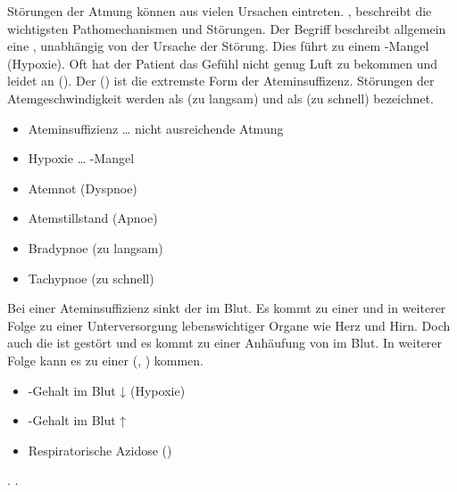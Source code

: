 {%
%
%
%
%
%
%
Störungen der Atmung können aus vielen Ursachen eintreten.
, beschreibt die
wichtigsten Pathomechanismen und Störungen.
Der Begriff  beschreibt allgemein eine
, unabhängig von der
Ursache der Störung. Dies führt zu einem -Mangel
(Hypoxie). Oft hat der Patient das Gefühl nicht genug Luft
zu bekommen und leidet an  ().
Der  () ist die extremste Form
der Ateminsuffizenz. Störungen der Atemgeschwindigkeit
werden als  (zu langsam) und als 
(zu schnell) bezeichnet.
}{
\begin{itemize}
  \item Ateminsuffizienz \ldots{} nicht ausreichende Atmung
  \item Hypoxie \ldots{} -Mangel
  \item Atemnot (Dyspnoe)
  \item Atemstillstand (Apnoe)
  \item Bradypnoe (zu langsam)
  \item Tachypnoe (zu schnell)
\end{itemize}
}{}{}{}


{%
Bei einer Ateminsuffizienz sinkt der  im
Blut. Es kommt zu einer  und in weiterer Folge
zu einer Unterversorgung lebenswichtiger Organe wie Herz und
Hirn.
Doch auch die  ist gestört und es kommt
zu einer Anhäufung von  im Blut. In weiterer Folge
kann es zu einer 
(,
) kommen.
}{
\begin{itemize}
    \item {}-Gehalt im Blut ↓ (Hypoxie)
    \item {}-Gehalt im Blut ↑
    \item Respiratorische Azidose
    ()
\end{itemize}
}{}{}{}




{%
.
}{.}{}{}{}

